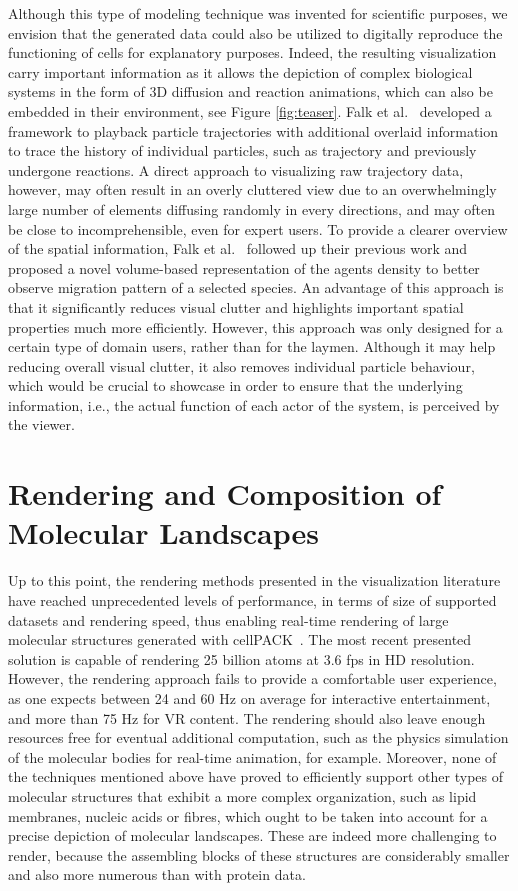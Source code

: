 Although this type of modeling technique was invented for scientific purposes, we envision that the generated data could also be utilized to digitally reproduce the functioning of cells for explanatory purposes.
Indeed, the resulting visualization carry important information as it allows the depiction of complex biological systems in the form of 3D diffusion and reaction animations, which can also be embedded in their environment, see Figure \ref{fig:teaser}.
Falk et al.~\cite{falk2009visualization} developed a framework to playback particle trajectories with additional overlaid information to trace the history of individual particles, such as trajectory and previously undergone reactions.
A direct approach to visualizing raw trajectory data, however, may often result in an overly cluttered view due to an overwhelmingly large number of elements diffusing randomly in every directions, and may often be close to incomprehensible, even for expert users.
To provide a clearer overview of the spatial information, Falk et al.~\cite{falk20103d} followed up their previous work and proposed a novel volume-based representation of the agents density to better observe migration pattern of a selected species.
An advantage of this approach is that it significantly reduces visual clutter and highlights important spatial properties much more efficiently.
However, this approach was only designed for a certain type of domain users, rather than for the laymen.
Although it may help reducing overall visual clutter, it also removes individual particle behaviour, which would be crucial to showcase in order to ensure that the underlying information, i.e., the actual function of each actor of the system, is perceived by the viewer.



\chapter{Rendering and Composition of Molecular Landscapes}
\label{sec:section3}

Up to this point, the rendering methods presented in the visualization literature have reached unprecedented levels of performance, in terms of size of supported datasets and rendering speed, thus enabling real-time rendering of large molecular structures generated with cellPACK~\cite{johnson2015cellpack}.
The most recent presented solution is capable of rendering 25 billion atoms at 3.6 fps in HD resolution.
However, the rendering approach fails to provide a comfortable user experience, as one expects between 24 and 60 Hz on average for interactive entertainment, and more than 75 Hz for VR content.
The rendering should also leave enough resources free for eventual additional computation, such as the physics simulation of the molecular bodies for real-time animation, for example.
Moreover, none of the techniques mentioned above have proved to efficiently support other types of molecular structures that exhibit a more complex organization, such as lipid membranes, nucleic acids or fibres, which ought to be taken into account for a precise depiction of molecular landscapes.
These are indeed more challenging to render, because the assembling blocks of these structures are considerably smaller and also more numerous than with protein data.

